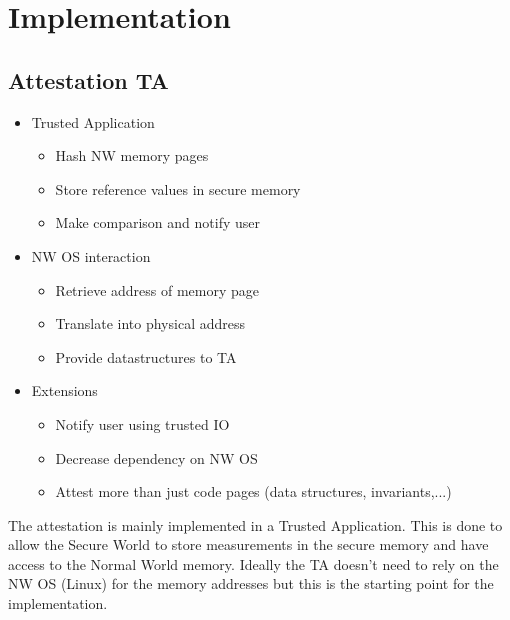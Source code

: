 \documentclass{report}
\begin{document}
\chapter{Implementation}

\section{Attestation TA}

\begin{itemize}
\item Trusted Application \begin{itemize}
\item Hash NW memory pages
\item Store reference values in secure memory
\item Make comparison and notify user 
\end{itemize}
\item NW OS interaction \begin{itemize}
\item Retrieve address of memory page
\item Translate into physical address
\item Provide datastructures to TA
\end{itemize}
\item Extensions \begin{itemize}
\item Notify user using trusted IO
\item Decrease dependency on NW OS
\item Attest more than just code pages (data structures, invariants,...)
\end{itemize}
\end{itemize}

The attestation is mainly implemented in a Trusted Application. This is done to allow the Secure World to store measurements in the secure memory and have access to the Normal World memory. Ideally the TA doesn't need to rely on the NW OS (Linux) for the memory addresses but this is the starting point for the implementation.
\end{document}

